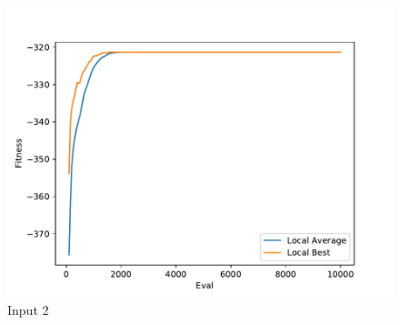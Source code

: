 \documentclass{standalone}
\begin{document}
\begin{figure}[!htb]
	\caption{Input 2}
	\label{fig:graph_2061}
	\includegraphics[width=\textwidth]{../graphs/graphs/2061.pdf}
\end{figure}
\end{document}
